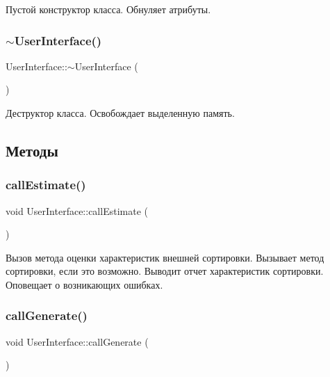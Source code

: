 Пустой конструктор класса. Обнуляет атрибуты. 

\hypertarget{class_user_interface_ae588b2ff1711a016dd4c6fc5002c0841}{}\label{class_user_interface_ae588b2ff1711a016dd4c6fc5002c0841} 
\subsubsection{\texorpdfstring{$\sim$\+User\+Interface()}{~UserInterface()}}
{\footnotesize\ttfamily User\+Interface\+::$\sim$\+User\+Interface (\begin{DoxyParamCaption}{ }\end{DoxyParamCaption})}



Деструктор класса. Освобождает выделенную память. 



\subsection{Методы}
\hypertarget{class_user_interface_a7957201b3543ea0561d48bcc0a0d329e}{}\label{class_user_interface_a7957201b3543ea0561d48bcc0a0d329e} 
\subsubsection{\texorpdfstring{call\+Estimate()}{callEstimate()}}
{\footnotesize\ttfamily void User\+Interface\+::call\+Estimate (\begin{DoxyParamCaption}{ }\end{DoxyParamCaption})\hspace{0.3cm}{\ttfamily [private]}}



Вызов метода оценки характеристик внешней сортировки. Вызывает метод сортировки, если это возможно. Выводит отчет характеристик сортировки. Оповещает о возникающих ошибках. 

\hypertarget{class_user_interface_a27c547dadfd5588d5b734e253b2e8a4a}{}\label{class_user_interface_a27c547dadfd5588d5b734e253b2e8a4a} 
\subsubsection{\texorpdfstring{call\+Generate()}{callGenerate()}}
{\footnotesize\ttfamily void User\+Interface\+::call\+Generate (\begin{DoxyParamCaption}{ }\end{DoxyParamCaption})\hspace{0.3cm}{\ttfamily [private]}}



